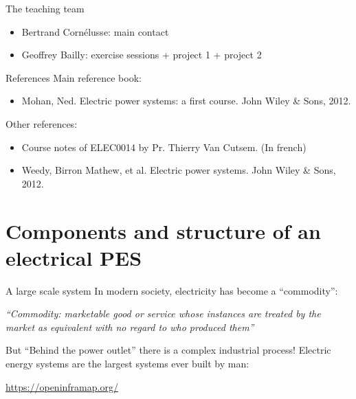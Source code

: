 \begin{frame}
{The teaching team}
\begin{itemize}
\item Bertrand Cornélusse: main contact
\item Geoffrey Bailly: exercise sessions + project 1 + project 2
\end{itemize}
\end{frame}

\begin{frame}{References}
Main reference book:
\begin{itemize}
\item Mohan, Ned. Electric power systems: a first course. John Wiley \& Sons, 2012.
\end{itemize}
Other references:
\begin{itemize}
\item Course notes of ELEC0014 by Pr. Thierry Van Cutsem. (In french)
\item Weedy, Birron Mathew, et al. Electric power systems. John Wiley \& Sons, 2012.
\end{itemize}
\end{frame}

\section[Components and structure of an electrical power and energy system]{Components and structure of an electrical PES}

\begin{frame}
{A large scale system}
In modern society, electricity has become a “commodity”:
\begin{center}
\emph{“Commodity: marketable good or service whose instances are treated by the market as equivalent with no regard to who produced them”}
\end{center}
But “Behind the power outlet” there is a complex industrial process!
Electric energy systems are the largest systems ever built by man:
\begin{center}
\url{https://openinframap.org/}
\end{center}
\end{frame}

